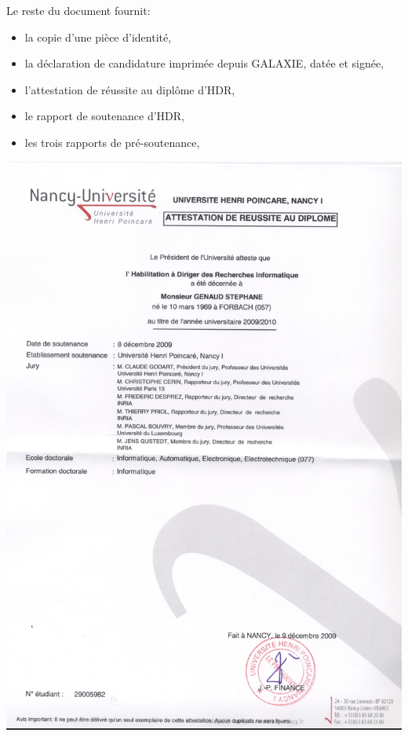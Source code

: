 \documentclass[11pt]{article}
\begin{document}
Le reste du document fournit:\\
\begin{itemize}
\item la copie d'une pièce d'identité,
\item la déclaration de candidature imprimée depuis GALAXIE, datée et signée,
\item l'attestation de réussite au diplôme d'HDR,
\item le rapport de soutenance d'HDR,
\item les trois rapports de pré-soutenance,
\end{itemize}



\includegraphics[height=.98\textheight]{attestation_hdr_steph.jpg}




%
%
\end{document}
